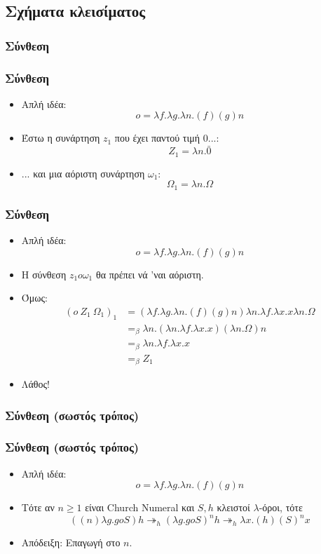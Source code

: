 \documentclass{beamer}
\begin{document}
\subsection{Σχήματα κλεισίματος}

\subsubsection{Σύνθεση}

\begin{frame}
  \frametitle{Σύνθεση}
  \begin{itemize}
  \item Απλή ιδέα: $$o = \lambda f. \lambda g. \lambda n . (f) (g) n$$
    \pause
  \item Έστω η συνάρτηση $z_1$ που έχει παντού τιμή 0...:
    $$Z_1 = \lambda n. \bar{0}$$ \pause
  \item ... και μια αόριστη συνάρτηση $\omega_1$:
    $$\Omega_1 = \lambda n. \Omega$$
  \end{itemize}
\end{frame}

\begin{frame}
  \frametitle{Σύνθεση}
  \begin{itemize}
  \item Απλή ιδέα: $$o = \lambda f. \lambda g. \lambda n . (f) (g) n$$
  \item Η σύνθεση $z_1 o \omega_1$ θα πρέπει νά 'ναι αόριστη.  \pause
  \item Όμως:
    $$
    \begin{array}{ll}
      (o\:Z_1\:\Omega_1)_1 &= (\lambda f. \lambda g. \lambda n . (f)
      (g) n) \lambda n. \lambda f. \lambda x . x \lambda n. \Omega \\
      &=_\beta \lambda n . (\lambda n. \lambda f. \lambda x . x)
      (\lambda n. \Omega) n \\
      &=_\beta \lambda n . \lambda f. \lambda x . x \\
      &=_\beta Z_1
    \end{array}
    $$
    \pause
  \item Λάθος!
  \end{itemize}
\end{frame}

\subsubsection{Σύνθεση (σωστός τρόπος)}

\begin{frame}
  \frametitle{Σύνθεση (σωστός τρόπος)}
  \begin{itemize}
  \item Απλή ιδέα: $$o = \lambda f. \lambda g. \lambda n . (f) (g) n$$
    \pause
  \item Τότε αν $n \geqslant 1$ είναι Church Numeral και $S, h$
    κλειστοί $\lambda$-όροι, τότε
    $$ ((n) \lambda g . g o S) h \twoheadrightarrow _h (\lambda g . g
    o S)^n h \twoheadrightarrow _h \lambda x . (h) (S)^n x $$ \pause
  \item Απόδειξη: Επαγωγή στο $n$.
  \end{itemize}
\end{frame}
\end{document}
